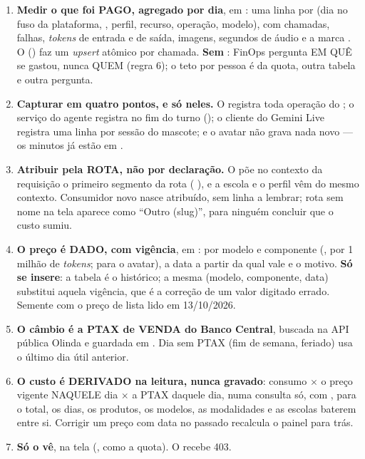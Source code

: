\begin{enumerate}
  \item \textbf{Medir o que foi PAGO, agregado por dia}, em
    : uma linha por (dia no fuso da plataforma,
    , perfil, recurso, operação, modelo), com chamadas, falhas,
    \emph{tokens} de entrada e de saída, imagens, segundos de áudio e a marca
    . O  () faz um
    \emph{upsert} atômico por chamada. \textbf{Sem }: FinOps
    pergunta EM QUÊ se gastou, nunca QUEM (regra 6); o teto por pessoa é da
    quota, outra tabela e outra pergunta.
  \item \textbf{Capturar em quatro pontos, e só neles.} O
     registra toda operação do ; o
    serviço do agente registra no fim do turno (); o
    cliente do Gemini Live registra uma linha por sessão do mascote; e o avatar
    não grava nada novo --- os minutos já estão em .
  \item \textbf{Atribuir pela ROTA, não por declaração.} O
     põe no contexto da requisição o primeiro segmento
    da rota ( \seta{} ), e a escola e o perfil
    vêm do mesmo contexto. Consumidor novo nasce atribuído, sem linha a
    lembrar; rota sem nome na tela aparece como \enquote{Outro (slug)}, para
    ninguém concluir que o custo sumiu.
  \item \textbf{O preço é DADO, com vigência}, em : por
    modelo e componente (,  por 1 milhão de
    \emph{tokens};  para o avatar), a data a partir da qual vale e o
    motivo. \textbf{Só se insere}: a tabela é o histórico; a mesma
    (modelo, componente, data) substitui aquela vigência, que é a correção de
    um valor digitado errado. Semente com o preço de lista lido em 13/10/2026.
  \item \textbf{O câmbio é a PTAX de VENDA do Banco Central}, buscada na API
    pública Olinda e guardada em . Dia sem PTAX (fim de
    semana, feriado) usa o último dia útil anterior.
  \item \textbf{O custo é DERIVADO na leitura, nunca gravado}: consumo
    $\times$ o preço vigente NAQUELE dia $\times$ a PTAX daquele dia, numa
    consulta só, com , para o total, os dias, os produtos, os
    modelos, as modalidades e as escolas baterem entre si. Corrigir um preço
    com data no passado recalcula o painel para trás.
  \item \textbf{Só o  vê}, na tela 
    (, como a quota). O  recebe 403.
\end{enumerate}

